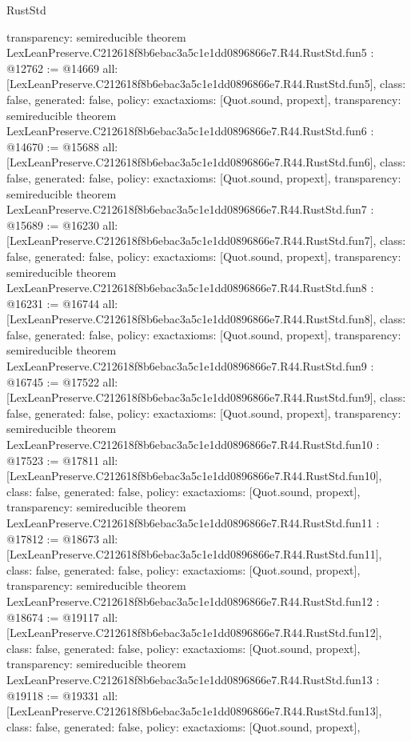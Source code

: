 \begin{lexlean}{RustStd}
\begin{coremodule}
{  transparency: semireducible
}
theorem LexLeanPreserve.C212618f8b6ebac3a5c1e1dd0896866e7.R44.RustStd.fun5 : @12762 := @14669 {
  all: [LexLeanPreserve.C212618f8b6ebac3a5c1e1dd0896866e7.R44.RustStd.fun5],
  class: false,
  generated: false,
  policy: exact{axioms: [Quot.sound, propext]},
  transparency: semireducible
}
theorem LexLeanPreserve.C212618f8b6ebac3a5c1e1dd0896866e7.R44.RustStd.fun6 : @14670 := @15688 {
  all: [LexLeanPreserve.C212618f8b6ebac3a5c1e1dd0896866e7.R44.RustStd.fun6],
  class: false,
  generated: false,
  policy: exact{axioms: [Quot.sound, propext]},
  transparency: semireducible
}
theorem LexLeanPreserve.C212618f8b6ebac3a5c1e1dd0896866e7.R44.RustStd.fun7 : @15689 := @16230 {
  all: [LexLeanPreserve.C212618f8b6ebac3a5c1e1dd0896866e7.R44.RustStd.fun7],
  class: false,
  generated: false,
  policy: exact{axioms: [Quot.sound, propext]},
  transparency: semireducible
}
theorem LexLeanPreserve.C212618f8b6ebac3a5c1e1dd0896866e7.R44.RustStd.fun8 : @16231 := @16744 {
  all: [LexLeanPreserve.C212618f8b6ebac3a5c1e1dd0896866e7.R44.RustStd.fun8],
  class: false,
  generated: false,
  policy: exact{axioms: [Quot.sound, propext]},
  transparency: semireducible
}
theorem LexLeanPreserve.C212618f8b6ebac3a5c1e1dd0896866e7.R44.RustStd.fun9 : @16745 := @17522 {
  all: [LexLeanPreserve.C212618f8b6ebac3a5c1e1dd0896866e7.R44.RustStd.fun9],
  class: false,
  generated: false,
  policy: exact{axioms: [Quot.sound, propext]},
  transparency: semireducible
}
theorem LexLeanPreserve.C212618f8b6ebac3a5c1e1dd0896866e7.R44.RustStd.fun10 : @17523 := @17811 {
  all: [LexLeanPreserve.C212618f8b6ebac3a5c1e1dd0896866e7.R44.RustStd.fun10],
  class: false,
  generated: false,
  policy: exact{axioms: [Quot.sound, propext]},
  transparency: semireducible
}
theorem LexLeanPreserve.C212618f8b6ebac3a5c1e1dd0896866e7.R44.RustStd.fun11 : @17812 := @18673 {
  all: [LexLeanPreserve.C212618f8b6ebac3a5c1e1dd0896866e7.R44.RustStd.fun11],
  class: false,
  generated: false,
  policy: exact{axioms: [Quot.sound, propext]},
  transparency: semireducible
}
theorem LexLeanPreserve.C212618f8b6ebac3a5c1e1dd0896866e7.R44.RustStd.fun12 : @18674 := @19117 {
  all: [LexLeanPreserve.C212618f8b6ebac3a5c1e1dd0896866e7.R44.RustStd.fun12],
  class: false,
  generated: false,
  policy: exact{axioms: [Quot.sound, propext]},
  transparency: semireducible
}
theorem LexLeanPreserve.C212618f8b6ebac3a5c1e1dd0896866e7.R44.RustStd.fun13 : @19118 := @19331 {
  all: [LexLeanPreserve.C212618f8b6ebac3a5c1e1dd0896866e7.R44.RustStd.fun13],
  class: false,
  generated: false,
  policy: exact{axioms: [Quot.sound, propext]},
}
\end{coremodule}
\end{lexlean}
